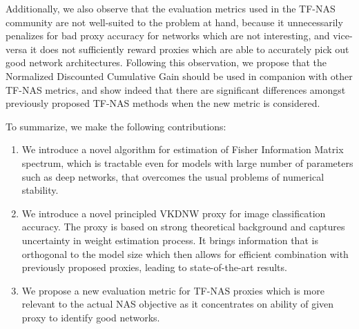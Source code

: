 Additionally, we also observe that the evaluation metrics used in the TF-NAS community are not well-suited to the problem at hand, because it unnecessarily penalizes for bad proxy accuracy for networks which are not interesting, and vice-versa it does not sufficiently reward proxies which are able to accurately pick out good network architectures. Following this observation, we propose that the Normalized Discounted Cumulative Gain should be used in companion with other TF-NAS metrics, and show indeed that there are significant differences amongst previously proposed TF-NAS methods when the new metric is considered. 

To summarize, we make the following contributions:
\begin{enumerate}
    \item We introduce a novel algorithm for estimation of Fisher Information Matrix spectrum, which is tractable even for models with large number of parameters such as deep networks, that overcomes the usual problems of numerical stability.
    \item We introduce a novel principled VKDNW proxy for image classification accuracy. The proxy is based on strong theoretical background and captures uncertainty in weight estimation process. It brings information that is orthogonal to the model size which then allows for efficient combination with previously proposed proxies, leading to state-of-the-art results.
    \item We propose a new evaluation metric for TF-NAS proxies which is more relevant to the actual NAS objective as it concentrates on ability of given proxy to identify good networks.
\end{enumerate}



